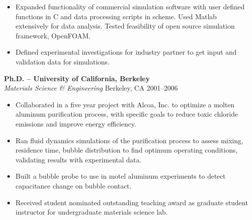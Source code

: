 \documentclass[11pt]{res} %
\begin{document}
\begin{resume}
\begin{itemize}
 \item Expanded functionality of commercial simulation software with user defined functions in C and data processing scripts in scheme.  Used Matlab extensively for data analysis. Tested feasibility of open source simulation framework, OpenFOAM.
\item Defined experimental investigations for industry partner to get input and validation data for  simulations.
\end{itemize}
%
\vspace{-8pt}
\textbf{Ph.D. -- University of California, Berkeley} \\
\textit{Materials Science \& Engineering}              \hfill  Berkeley, CA 2001--2006 
\vspace{2pt}
\begin{itemize} \itemsep -1pt 
	\item Collaborated in a five year project with Alcoa, Inc. to optimize a molten aluminum purification process, with specific goals to reduce toxic chloride emissions and improve energy efficiency.
	\item Ran fluid dynamics simulations of the purification process to assess mixing, residence time, bubble distribution to find optimum operating conditions, validating results with experimental data.
	\item Built a bubble probe to use in motel aluminum experiments to detect capacitance change on bubble contact.
    \item Received student nominated outstanding teaching award as graduate student instructor for undergraduate materials science lab.
\end{itemize}
%
%
 \vspace{4pt}

\end{resume}
\end{document}
